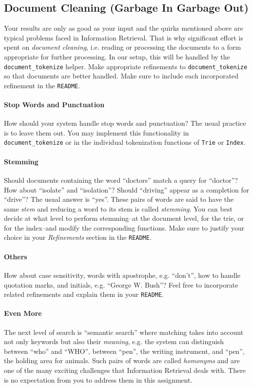 \documentclass[addpoints]{exam}
\begin{document}
\subsection{Document Cleaning (Garbage In Garbage Out)}

Your results are only as good as your input and the quirks mentioned above are typical problems faced in Information Retrieval. That is why significant effort is spent on \textit{document cleaning}, i.e. reading or processing the documents to a form appropriate for further processing. In our setup, this will be handled by the \texttt{document\_tokenize} helper. Make appropriate refinements to \texttt{document\_tokenize} so that documents are better handled. Make sure to include each incorporated refinement in the \texttt{README}. 

\paragraph{Stop Words and Punctuation} How should your system handle stop words and punctuation? The usual practice is to leave them out. You may implement this functionality in \texttt{document\_tokenize} or in the individual tokenization functions of \texttt{Trie} or \texttt{Index}.

\paragraph{Stemming} Should documents containing the word ``doctors'' match a query for ``doctor''? How about ``isolate'' and ``isolation''? Should ``driving'' appear as a completion for ``drive''? The usual answer is ``yes''. These pairs of words are said to have the same \textit{stem} and reducing a word to its stem is called \textit{stemming}. You can best decide at what level to perform stemming--at the document level, for the trie, or for the index--and modify the corresponding functions. Make sure to justify your choice in your \textit{Refinements} section in the \texttt{README}.

\paragraph{Others} How about case sensitivity, words with apostrophe, e.g. ``don't'', how to handle quotation marks, and initials, e.g. ``George W. Bush''? Feel free to incorporate related refinements and explain them in your \texttt{README}.

\paragraph{Even More} The next level of search is ``semantic search'' where matching takes into account not only keywords but also their \textit{meaning}, e.g. the system can distinguish between ``who'' and ``WHO'', between ``pen'', the writing instrument, and ``pen'', the holding area for animals. Such pairs of words are called \textit{homonyms} and are one of the many exciting challenges that Information Retrieval deals with. There is no expectation from you to address them in this assignment.
\end{document}
